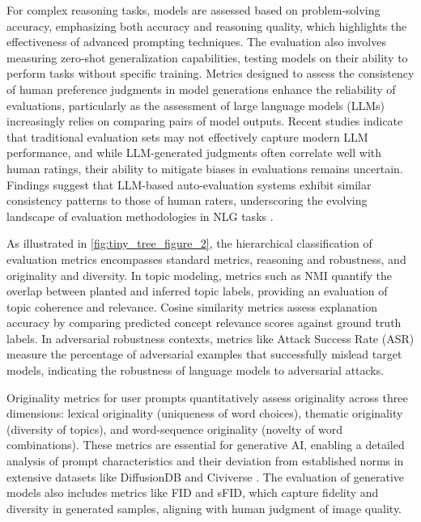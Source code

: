 For complex reasoning tasks, models are assessed based on problem-solving accuracy, emphasizing both accuracy and reasoning quality, which highlights the effectiveness of advanced prompting techniques. The evaluation also involves measuring zero-shot generalization capabilities, testing models on their ability to perform tasks without specific training. Metrics designed to assess the consistency of human preference judgments in model generations enhance the reliability of evaluations, particularly as the assessment of large language models (LLMs) increasingly relies on comparing pairs of model outputs. Recent studies indicate that traditional evaluation sets may not effectively capture modern LLM performance, and while LLM-generated judgments often correlate well with human ratings, their ability to mitigate biases in evaluations remains uncertain. Findings suggest that LLM-based auto-evaluation systems exhibit similar consistency patterns to those of human raters, underscoring the evolving landscape of evaluation methodologies in NLG tasks \cite{oh2024generativeaiparadoxevaluation,ghosh2024comparedespairreliablepreference}.

As illustrated in \autoref{fig:tiny_tree_figure_2}, the hierarchical classification of evaluation metrics encompasses standard metrics, reasoning and robustness, and originality and diversity. In topic modeling, metrics such as NMI quantify the overlap between planted and inferred topic labels, providing an evaluation of topic coherence and relevance. Cosine similarity metrics assess explanation accuracy by comparing predicted concept relevance scores against ground truth labels. In adversarial robustness contexts, metrics like Attack Success Rate (ASR) measure the percentage of adversarial examples that successfully mislead target models, indicating the robustness of language models to adversarial attacks.

Originality metrics for user prompts quantitatively assess originality across three dimensions: lexical originality (uniqueness of word choices), thematic originality (diversity of topics), and word-sequence originality (novelty of word combinations). These metrics are essential for generative AI, enabling a detailed analysis of prompt characteristics and their deviation from established norms in extensive datasets like DiffusionDB and Civiverse \cite{palmini2024patternscreativityuserinput}. The evaluation of generative models also includes metrics like FID and sFID, which capture fidelity and diversity in generated samples, aligning with human judgment of image quality.

